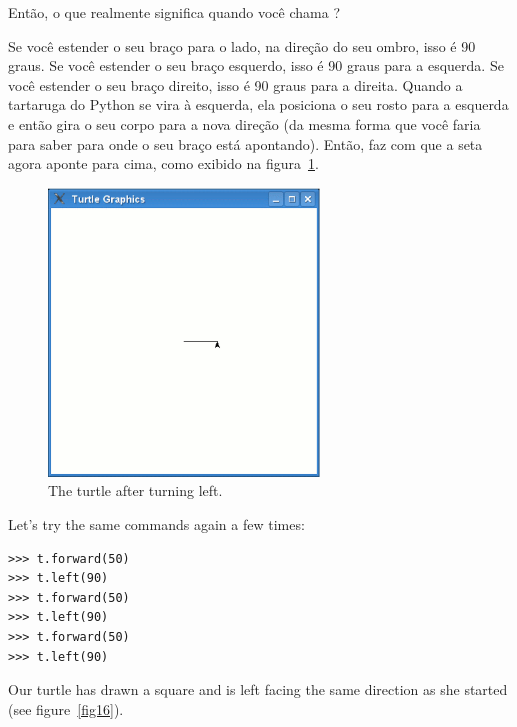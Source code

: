Então, o que realmente significa quando você chama ?
\par
Se você estender o seu braço para o lado, na direção do seu ombro, isso é 90 graus. Se você estender o seu braço esquerdo, isso é 90 graus para a esquerda. Se você estender o seu braço direito, isso é 90 graus para a direita. Quando a tartaruga do Python se vira à esquerda, ela posiciona o seu rosto para a esquerda e então gira o seu corpo para a nova direção (da mesma forma que você faria para saber para onde o seu braço está apontando). Então,  faz com que a seta agora aponte para cima, como exibido na figura~\ref{fig15}.

\begin{figure}
\begin{center}
\includegraphics[width=72mm]{eps/figure15.eps}
\end{center}
\caption{The turtle after turning left.}\label{fig15}
\end{figure}

Let's try the same commands again a few times:

\begin{listing}
\begin{verbatim}
>>> t.forward(50)
>>> t.left(90)
>>> t.forward(50)
>>> t.left(90)
>>> t.forward(50)
>>> t.left(90)
\end{verbatim}
\end{listing}

Our turtle has drawn a square and is left facing the same direction as she started (see figure~\ref{fig16}).

